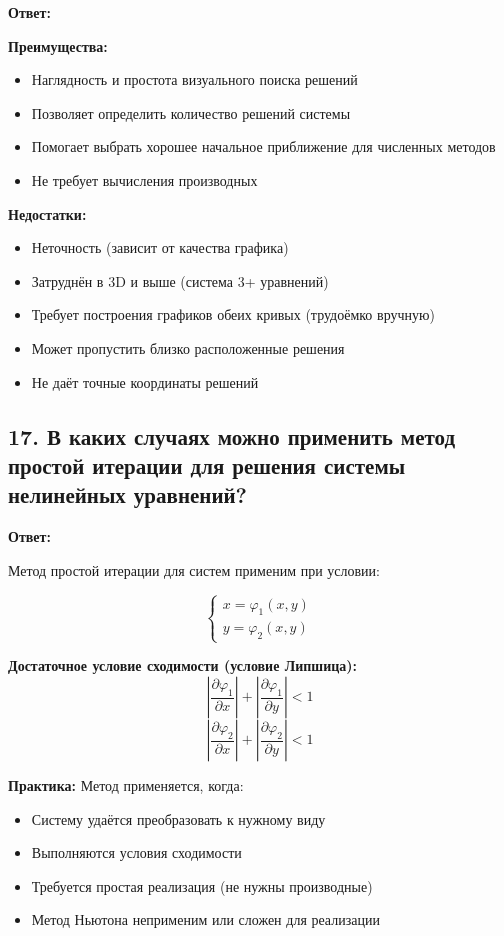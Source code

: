 \documentclass[a4paper,12pt]{article}
\begin{document}
\textbf{Ответ:} 

\textbf{Преимущества:}
\begin{itemize}
    \item Наглядность и простота визуального поиска решений
    \item Позволяет определить количество решений системы
    \item Помогает выбрать хорошее начальное приближение для численных методов
    \item Не требует вычисления производных
\end{itemize}

\textbf{Недостатки:}
\begin{itemize}
    \item Неточность (зависит от качества графика)
    \item Затруднён в 3D и выше (система 3+ уравнений)
    \item Требует построения графиков обеих кривых (трудоёмко вручную)
    \item Может пропустить близко расположенные решения
    \item Не даёт точные координаты решений
\end{itemize}

\subsection*{17. В каких случаях можно применить метод простой итерации для решения системы нелинейных уравнений?}

\textbf{Ответ:} 

Метод простой итерации для систем применим при условии:

\[
\begin{cases}
x = \varphi_1(x, y) \\
y = \varphi_2(x, y)
\end{cases}
\]

\textbf{Достаточное условие сходимости (условие Липшица):}
\[
    \left| \frac{\partial \varphi_1}{\partial x} \right| + \left| \frac{\partial \varphi_1}{\partial y} \right| < 1
\]
\[
    \left| \frac{\partial \varphi_2}{\partial x} \right| + \left| \frac{\partial \varphi_2}{\partial y} \right| < 1
\]

\textbf{Практика:} Метод применяется, когда:
\begin{itemize}
    \item Систему удаётся преобразовать к нужному виду
    \item Выполняются условия сходимости
    \item Требуется простая реализация (не нужны производные)
    \item Метод Ньютона неприменим или сложен для реализации
\end{itemize}
\end{document}
